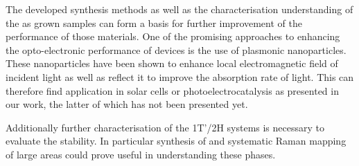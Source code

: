 The developed synthesis methods as well as the characterisation understanding of the as grown samples can form a basis for further improvement of the performance of those materials. One of the promising approaches to enhancing the opto-electronic performance of devices is the use of plasmonic nanoparticles. These nanoparticles have been shown to enhance local electromagnetic field of incident light as well as reflect it to improve the absorption rate of light. This can therefore find application in solar cells or photoelectrocatalysis as presented in our work, the latter of which has not been presented yet.

Additionally further characterisation of the 1T'/2H systems is necessary to evaluate the stability. In particular synthesis of and systematic Raman mapping of large areas could prove useful in understanding these phases.